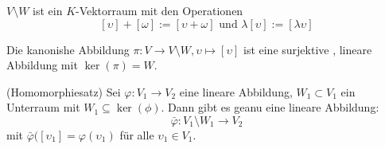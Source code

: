 \documentclass[../Algebra_script.tex]{subfiles}
\begin{document}
\begin{proposition}
	$V \setminus W$ ist ein $K$-Vektorraum mit den Operationen
	\[[\upsilon] + [\omega] := [\upsilon + \omega] \text{ und } \lambda[\upsilon] := [\lambda\upsilon]\]
\end{proposition}

\begin{proposition}
	Die kanonishe Abbildung $\pi: V \to V\setminus W, \upsilon \mapsto [\upsilon]$ ist eine surjektive , lineare Abbildung mit $\ker(\pi) = W$.
\end{proposition}

\begin{theorem}{(Homomorphiesatz)}
	Sei $\varphi: V_1 \to V_2$ eine lineare Abbildung, $W_1 \subset V_1$ ein Unterraum mit $W_1 \subseteq \ker(\phi)$. Dann gibt es geanu eine lineare Abbildung:
	\[\bar{\varphi}: V_1\setminus W_1 \to V_2\]
	mit $\bar{\varphi}([\upsilon_1] = \varphi(\upsilon_1)$ für alle $\upsilon_1 \in V_1$.
\end{theorem}
\end{document}
